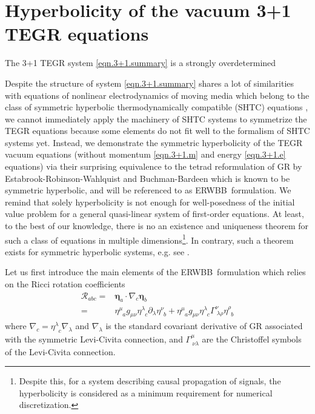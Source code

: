 \documentclass[
10pt, %
a4paper, %
oneside, %
twocolumn,
headinclude,footinclude, %
BCOR5mm, %
]{scrartcl}
\newcommand{\ERWBB}{{ERWBB}}
\newcommand{\pd}[1]{\partial_{#1}}
\newcommand{\itetrsymbol}{\eta}
\newcommand{\itetr}[2]{\itetrsymbol^{#1}_{\phantom{#1}#2}}
\begin{document}
	
	
	\section{Hyperbolicity of the vacuum 3+1 TEGR equations}

	The 3+1 TEGR system \eqref{eqn.3+1.summary} is a strongly overdetermined 

	Despite the structure of system \eqref{eqn.3+1.summary} shares a lot of
	similarities with equations of nonlinear electrodynamics of moving media
	which belong to the class of symmetric hyperbolic thermodynamically
	compatible (SHTC) equations
	\cite{SHTC-GENERIC-CMAT,GodRom1996b,Rom1998,Rom2001,God1961}, we cannot
	immediately apply the machinery of SHTC systems to symmetrize the TEGR
	equations because some elements do not fit well to the formalism of SHTC
	systems yet. Instead, we demonstrate the symmetric hyperbolicity of the TEGR
	vacuum equations (without momentum \eqref{eqn.3+1.m} and energy
	\eqref{eqn.3+1.e} equations) via their surprising equivalence to the tetrad
	reformulation of GR by Estabrook-Robinson-Wahlquist \cite{Estabrook1997} and
	Buchman-Bardeen \cite{Buchman2003} which is known to be symmetric
	hyperbolic, and will be referenced to as \ERWBB\ formulation. We remind that
	solely hyperbolicity is not enough for well-posedness of the initial value
	problem for a general quasi-linear system of first-order equations. At
	least, to the best of our knowledge, there is no an existence and uniqueness
	theorem for such a class of equations in multiple dimensions\footnote{
	Despite this, for a system describing causal propagation of 	signals, the
	hyperbolicity is considered as a minimum requirement for numerical
	discretization.}. In contrary, such a theorem exists for symmetric
	hyperbolic systems, e.g. see \cite{Serre2007}.
	
	Let us first introduce the main elements of the \ERWBB\ formulation which relies on the Ricci 
	rotation coefficients
	\begin{align}\label{eqn.Ricci.rot}
		\mathcal{R}_{abc} 
		= & \bm{\itetrsymbol}_a\cdot\nabla_c \bm{\itetrsymbol}_b \nonumber\\
		= & \itetr{\mu}{a} g_{\mu\nu} \itetr{\lambda}{c} \pd{\lambda} \itetr{\nu}{b} 
		+   \itetr{\mu}{a} g_{\mu\nu} \itetr{\lambda}{c} \Gamma^{\nu}_{\ \lambda\rho} 
		\itetr{\rho}{b}	
	\end{align}
	where $ \nabla_c = \itetr{\lambda}{c} \nabla_{\lambda} $ and $ \nabla_{\lambda} $ is the 
	standard 
	covariant derivative of GR associated with the symmetric Levi-Civita connection, and $ 
	\Gamma^{\mu}_{\ 
		\nu\lambda} $ are the Christoffel symbols of the Levi-Civita connection.
	
\end{document}
